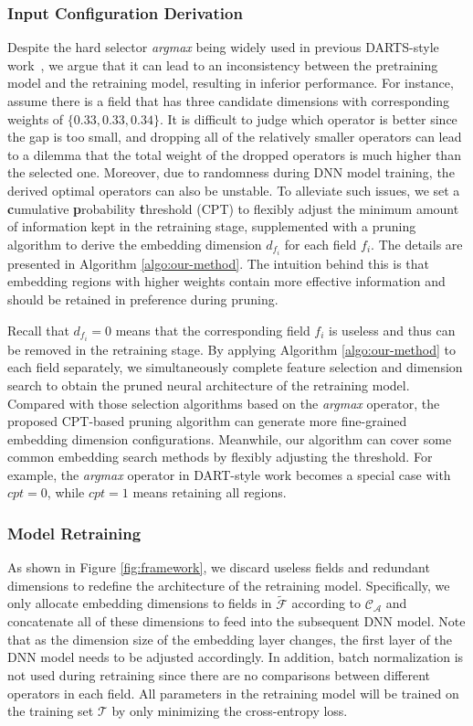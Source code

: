 \documentclass[10pt,journal,compsoc]{IEEEtran}
\begin{document}
\subsubsection{Input Configuration Derivation}
Despite the hard selector \textit{argmax} being widely used in previous DARTS-style work~\cite{liu2018darts, zhao2020memory}, we argue that it can lead to an inconsistency between the pretraining model and the retraining model, resulting in inferior performance. For instance, assume there is a field that has three candidate dimensions with corresponding weights of  $\{0.33,0.33,0.34\}$. 
It is difficult to judge which operator is better since the gap is too small, and dropping all of the relatively smaller operators can lead to a dilemma that the total weight of the dropped operators is much higher than the selected one.
Moreover, due to randomness during DNN model training, the derived optimal operators can also be unstable. To alleviate such issues, we set a \textbf{c}umulative \textbf{p}robability \textbf{t}hreshold (CPT) to flexibly adjust the minimum amount of information kept in the retraining stage, supplemented with a pruning algorithm to derive the embedding dimension ${d}_{f_i}$ for each field $f_i$. The details are presented in Algorithm \ref{algo:our-method}.
The intuition behind this is that embedding regions with higher weights contain more effective information and should be retained in preference during pruning. 

Recall that ${d}_{f_i}=0$ means that the corresponding field $f_i$ is useless and thus can be removed in the retraining stage. By applying Algorithm \ref{algo:our-method} to each field separately, we simultaneously complete feature selection and dimension search to obtain the pruned neural architecture of the retraining model.
Compared with those selection algorithms based on the \textit{argmax} operator, the proposed CPT-based pruning algorithm can generate more fine-grained embedding dimension configurations. Meanwhile, our algorithm can cover some common embedding search methods by flexibly adjusting the threshold. For example, the \textit{argmax} operator in DART-style work \cite{liu2018darts,zhao2020memory} becomes a special case with  $cpt=0$,  while $cpt = 1$ means retaining all regions. 

\subsubsection{Model Retraining}
As shown in Figure \ref{fig:framework}, we discard useless fields and redundant dimensions to redefine the architecture of the retraining model. Specifically, we only allocate embedding dimensions to fields in $\widetilde{\mathcal{F}}$ according to $\mathcal{C}_\mathcal{A}$ and concatenate all of these dimensions to feed into the subsequent DNN model. Note that as the dimension size of the embedding layer changes, the first layer of the DNN model needs to be adjusted accordingly. In addition, batch normalization is not used during retraining since there are no comparisons between different operators in each field.
All parameters in the retraining model will be trained on the training set $\mathcal{T}$ by only minimizing the cross-entropy loss.
\end{document}
